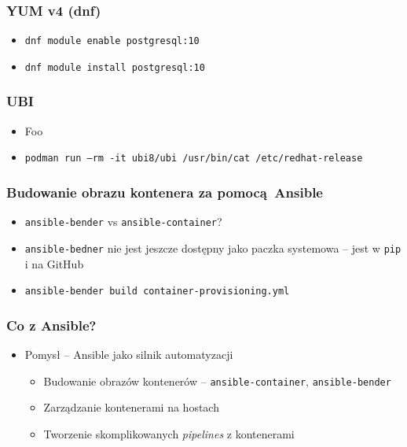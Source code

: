 \documentclass[dvipsnames,table]{beamer}
\begin{document}
\begin{frame}
\frametitle{YUM v4 (dnf)}
\begin{itemize}
	\item {\tt dnf module enable postgresql:10}
	\item {\tt dnf module install postgresql:10}
\end{itemize}
%
\end{frame}


\begin{frame}
	\frametitle{UBI}
	\begin{itemize}
		\item Foo
		\item {\tt podman run --rm -it ubi8/ubi /usr/bin/cat /etc/redhat-release}
	\end{itemize}
\end{frame}

\begin{frame}[fragile]
	\frametitle{Budowanie obrazu kontenera za pomocą Ansible}
%	
\begin{itemize}
	\item {\tt ansible-bender} vs {\tt ansible-container}?
	\item {\tt ansible-bedner} nie jest jeszcze dostępny jako paczka systemowa -- jest w {\tt pip} i na GitHub
	\item {\tt ansible-bender build container-provisioning.yml}
\end{itemize}
\end{frame}





\begin{frame}[fragile]
	\frametitle{Co z Ansible?}
	\begin{itemize}
		\item Pomysł -- Ansible jako silnik automatyzacji
		\begin{itemize}
			\item Budowanie obrazów kontenerów -- {\tt ansible-container}, {\tt ansible-bender}
			\item Zarządzanie kontenerami na hostach
			\item Tworzenie skomplikowanych {\it pipelines} z kontenerami
		\end{itemize}
	\end{itemize}
\end{frame}
%
\end{document}
